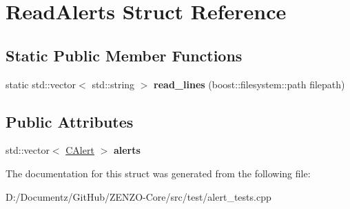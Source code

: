 \hypertarget{struct_read_alerts}{}\section{Read\+Alerts Struct Reference}
\label{struct_read_alerts}
\subsection*{Static Public Member Functions}
\begin{DoxyCompactItemize}
\item 
\mbox{\label{struct_read_alerts_a2c5cc409bd1b297282aea4ebdaee230b}} 
static std\+::vector$<$ std\+::string $>$ {\bfseries read\+\_\+lines} (boost\+::filesystem\+::path filepath)
\end{DoxyCompactItemize}
\subsection*{Public Attributes}
\begin{DoxyCompactItemize}
\item 
\mbox{\label{struct_read_alerts_a17f131ef314660af3de50cf098f34ee9}} 
std\+::vector$<$ \mbox{\hyperlink{class_c_alert}{C\+Alert}} $>$ {\bfseries alerts}
\end{DoxyCompactItemize}


The documentation for this struct was generated from the following file\+:\begin{DoxyCompactItemize}
\item 
D\+:/\+Documentz/\+Git\+Hub/\+Z\+E\+N\+Z\+O-\/\+Core/src/test/alert\+\_\+tests.\+cpp\end{DoxyCompactItemize}
